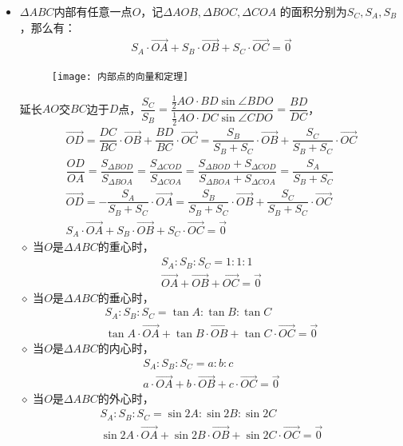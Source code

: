 \begin{itemize}[leftmargin=\inteval{\myitemleftmargin}pt,itemsep=
   \inteval{\myitemitempsep}pt,topsep=\inteval{\myitemtopsep}pt]
\item $ \Delta ABC $内部有任意一点$ O $，记$ \Delta AOB,\Delta BOC,\Delta COA $
的面积分别为$ S_C,S_A,S_B $，那么有：
\begin{align}\label{任意点面积定理}
    S_A\cdot\vec{OA}+ S_B\cdot\vec{OB}
    +S_C\cdot\vec{OC}= \vec{0}
\end{align}
\begin{figure}[h]
    \centering
    \texttt{[image: 内部点的向量和定理]}
\end{figure}
延长$ AO $交$ BC $边于$ D $点，$ \dfrac{S_C}{S_B}=\dfrac{\frac{1}{2}AO\cdot BD \sin \angle  BDO}{\frac{1}{2}AO\cdot DC \sin \angle CDO}=\dfrac{BD}{DC} $，
\begin{gather*}
    \vec{OD}=\dfrac{DC}{BC}\cdot\vec{OB} + 
    \dfrac{BD}{BC}\cdot\vec{OC}=\dfrac{S_B}{S_B+S_C}\cdot
    \vec{OB} +\dfrac{S_C}{S_B+S_C}\cdot\vec{OC} \\
    \dfrac{OD}{OA}=\dfrac{S_{\Delta BOD}}{S_{\Delta BOA}}=
    \dfrac{S_{\Delta COD}}{S_{\Delta COA}}=\dfrac{S_{\Delta BOD}+
        S_{\Delta COD}}{S_{\Delta BOA}+S_{\Delta COA}}=\dfrac{S_A}{S_B+S_C} \\
    \vec{OD}=-\dfrac{S_A}{S_B+S_C}\cdot\vec{OA}=
    \dfrac{S_B}{S_B+S_C}\cdot
    \vec{OB} +\dfrac{S_C}{S_B+S_C}\cdot\vec{OC} \\
    S_A\cdot\vec{OA}+ S_B\cdot\vec{OB}
    +S_C\cdot\vec{OC}= \vec{0}
\end{gather*}
$\diamond$ 当$ O $是$ \Delta ABC $的重心时，
\begin{gather*}
    S_A:S_B:S_C=1:1:1\\  \vec{OA}
    +\vec{OB}+\vec{OC}=\vec{0}
\end{gather*}
$\diamond$ 当$ O $是$ \Delta ABC $的垂心时，
\begin{gather*}
    S_A:S_B:S_C=\tan A:\tan B:\tan C \\ \tan A\cdot
    \vec{OA}+\tan B\cdot \vec{OB}
    +\tan C\cdot\vec{OC}=\vec{0}
\end{gather*}
$\diamond$ 当$ O $是$ \Delta ABC $的内心时，
\begin{gather*}
    S_A:S_B:S_C=a:b:c \\ a\cdot \vec{OA}
    +b\cdot\vec{OB}+
    c\cdot\vec{OC}=\vec{0}
\end{gather*}
$\diamond$ 当$ O $是$ \Delta ABC $的外心时，
\begin{gather*}
    S_A:S_B:S_C=\sin 2A:\sin 2B:\sin 2C  \\
    \sin 2A\cdot\vec{OA}+ \sin 2B\cdot
    \vec{OB}+
    \sin 2C\cdot\vec{OC}=\vec{0}
\end{gather*}


\end{itemize}
